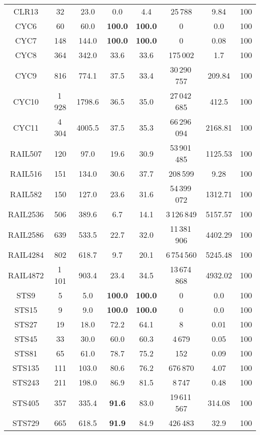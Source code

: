 {\begin{longtable}{@{\extracolsep{0pt}}cccccccc}
	CLR13 & 32 & 23.0 & 0.0 & 4.4 & 25\,788 & 9.84 & 100 \\
	CYC6 & 60 & 60.0 & \textbf{100.0} & \textbf{100.0} & 0 & 0.0 & 100 \\
	CYC7 & 148 & 144.0 & \textbf{100.0} & \textbf{100.0} & 0 & 0.08 & 100 \\
	CYC8 & 364 & 342.0 & 33.6 & 33.6 & 175\,002 & 1.7 & 100 \\
	CYC9 & 816 & 774.1 & 37.5 & 33.4 & 30\,290\,757 & 209.84 & 100 \\
	CYC10 & 1\,928 & 1798.6 & 36.5 & 35.0 & 27\,042\,685 & 412.5 & 100 \\
	CYC11 & 4\,304 & 4005.5 & 37.5 & 35.3 & 66\,296\,094 & 2168.81 & 100 \\
	RAIL507 & 120 & 97.0 & 19.6 & 30.9 & 53\,901\,485 & 1125.53 & 100 \\
	RAIL516 & 151 & 134.0 & 30.6 & 37.7 & 208\,599 & 9.28 & 100 \\
	RAIL582 & 150 & 127.0 & 23.6 & 31.6 & 54\,399\,072 & 1312.71 & 100 \\
	RAIL2536 & 506 & 389.6 & 6.7 & 14.1 & 3\,126\,849 & 5157.57 & 100 \\
	RAIL2586 & 639 & 533.5 & 22.7 & 32.0 & 11\,381\,906 & 4402.29 & 100 \\
	RAIL4284 & 802 & 618.7 & 9.7 & 20.1 & 6\,754\,560 & 5245.48 & 100 \\
	RAIL4872 & 1\,101 & 903.4 & 23.4 & 34.5 & 13\,674\,868 & 4932.02 & 100 \\
	STS9 & 5 & 5.0 & \textbf{100.0} & \textbf{100.0} & 0 & 0.0 & 100 \\
	STS15 & 9 & 9.0 & \textbf{100.0} & \textbf{100.0} & 0 & 0.0 & 100 \\
	STS27 & 19 & 18.0 & 72.2 & 64.1 & 8 & 0.01 & 100 \\
	STS45 & 33 & 30.0 & 60.0 & 60.3 & 4\,679 & 0.05 & 100 \\
	STS81 & 65 & 61.0 & 78.7 & 75.2 & 152 & 0.09 & 100 \\
	STS135 & 111 & 103.0 & 80.6 & 76.2 & 676\,870 & 4.07 & 100 \\
	STS243 & 211 & 198.0 & 86.9 & 81.5 & 8\,747 & 0.48 & 100 \\
	STS405 & 357 & 335.4 & \textbf{91.6} & 83.0 & 19\,611\,567 & 314.08 & 100 \\
	STS729 & 665 & 618.5 & \textbf{91.9} & 84.9 & 426\,483 & 32.9 & 100 \\
\end{longtable}
}